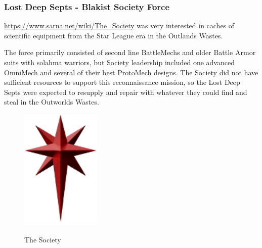 \subsubsection{Lost Deep Septs - Blakist Society Force}

\href{The Society}{https://www.sarna.net/wiki/The_Society} was very interested in caches of scientific equipment from the Star League era in the Outlands Wastes.

The force primarily consisted of second line BattleMechs and older Battle Armor suits with solahma warriors, but Society leadership included one advanced OmniMech and several of their best ProtoMech designs.
The Society did not have sufficient resources to support this reconnaissance mission, so the Lost Deep Septs were expected to resupply and repair with whatever they could find and steal in the Outworlds Wastes.

\begin{figure}[!h]
  \centering
  \includegraphics[alt='Society Logo', width=1.5in, height=2.292in]{img/Society.png}
  \caption*{The Society}
\end{figure}

